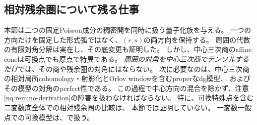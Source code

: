 \subsection{相対残余圏について残る仕事}
本節は二つの固定Poisson成分の稠密開を同時に扱う量子化族を与える。
一つの方向だけを固定した形式弧ではなく、$(r,s)$の両方向を保持する。
周囲の代数の有限対角分解は実在し、その底変更も証明した。
しかし、中心三次商のaffine coneは可換点でも原点で特異である。
\emph{周囲の対角を中心三次商でテンソルするだけ}では、その商や残余圏の対角にはならない。
次に必要なのは、中心三次商の相対局所cohomology・射影化とOrlov windowを含むproperなdg模型、
およびその模型の対角のperfect性である。
この過程で中心方向の混合を除かず、注意\ref{nq:rem:no-derivation}の障害を扱わなければならない。
特に、可換特殊点を含む二変数底全体での相対残余圏の比較は、
本節では証明していない。
一変数一般点での可換模型は、\cite[一般次元の中心三次非可換変形の可換復元定理]{NCCubicMain}で扱う。
